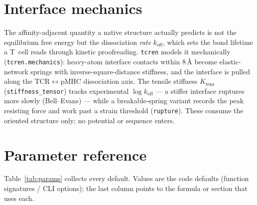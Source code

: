 \documentclass[11pt]{article}
\theoremstyle{oldplain}
\theoremstyle{oldrem}
\begin{document}
\section{Interface mechanics}\label{sec:mechanics}
The affinity-adjacent quantity a native structure actually predicts is not the equilibrium free energy
but the dissociation \emph{rate} $k_{\mathrm{off}}$, which sets the bond lifetime a T~cell reads through
kinetic proofreading. \texttt{tcren} models it mechanically (\texttt{tcren.mechanics}): heavy-atom
interface contacts within $8\,\text{\AA}$ become elastic-network springs with inverse-square-distance
stiffness, and the interface is pulled along the TCR$\leftrightarrow$pMHC dissociation axis. The tensile
stiffness $K_{\mathrm{tens}}$ (\texttt{stiffness\_tensor}) tracks experimental $\log k_{\mathrm{off}}$
--- a stiffer interface ruptures more slowly (Bell--Evans) --- while a breakable-spring variant records
the peak resisting force and work past a strain threshold (\texttt{rupture}). These consume the oriented
structure only; no potential or sequence enters.

\section{Parameter reference}\label{sec:params}
Table~\ref{tab:params} collects every default. Values are the code defaults (function signatures / CLI
options); the last column points to the formula or section that uses each.
\end{document}
